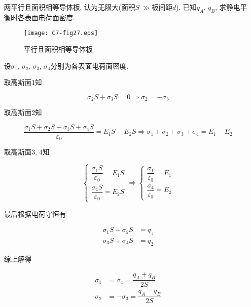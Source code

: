 \begin{example}
	两平行且面积相等导体板, 认为无限大(面积$S~\gg$板间距$d$). 已知$q_A$, $q_B$, 求静电平衡时各表面电荷面密度. 
	
	\begin{figure}[H]
		\centering
		\texttt{[image: C7-fig27.eps]}
		\caption{平行且面积相等导体板}
	\end{figure}
	
	\begin{solution}
		设$\sigma_1$, $\sigma_2$, $\sigma_3$, $\sigma_4$分别为各表面电荷面密度.
		
		取高斯面1知
		
		\begin{equation*}
			\sigma_2 S + \sigma_3 S = 0 \Rightarrow \sigma_2 = -\sigma_3
		\end{equation*}
		
		取高斯面2知
		
		\begin{equation*}
			\dfrac{\sigma_1 S + \sigma_2 S + \sigma_3 S + \sigma_4 S}{\varepsilon_0} = E_1 S - E_2 S \Rightarrow \sigma_1 + \sigma_2 + \sigma_3 + \sigma_4 = E_1 - E_2
		\end{equation*}
		
		取高斯面3, 4知
		
		\begin{equation*}
			\begin{cases}
				\dfrac{\sigma_1 S}{\varepsilon_0} = E_1 S \\   \dfrac{\sigma_4 S}{\varepsilon_0} = E_2 S 
			\end{cases} 
		    \Rightarrow
		    \begin{cases}
		    	\dfrac{\sigma_1}{\varepsilon_0} = E_1 \\  \dfrac{\sigma_4}{\varepsilon_0} = E_2
		    \end{cases}
		\end{equation*}

		最后根据电荷守恒有
		
		\begin{align*}
			\sigma_1 S + \sigma_2 S &= q_1 \\ 
			\sigma_3 S + \sigma_4 S &= q_2 
		\end{align*}
		
		综上解得
		
		\begin{align*}
			\sigma_1 &= \sigma_4 = \dfrac{q_A + q_B}{2 S} \\
			\sigma_2 &= -\sigma_3 = \dfrac{q_A-q_B}{2S}
		\end{align*}
		
	\end{solution}
	
\end{example}

